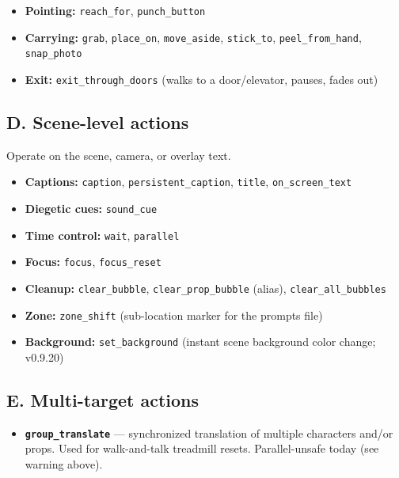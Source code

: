 \documentclass[
  11pt,
]{book}
\providecommand{\tightlist}{%
  \setlength{\itemsep}{0pt}\setlength{\parskip}{0pt}}
\begin{document}
\begin{itemize}
\tightlist
\item
  \textbf{Pointing:} \texttt{reach\_for}, \texttt{punch\_button}
\item
  \textbf{Carrying:} \texttt{grab}, \texttt{place\_on},
  \texttt{move\_aside}, \texttt{stick\_to}, \texttt{peel\_from\_hand},
  \texttt{snap\_photo}
\item
  \textbf{Exit:} \texttt{exit\_through\_doors} (walks to a
  door/elevator, pauses, fades out)
\end{itemize}

\subsection{D. Scene-level actions}\label{d.-scene-level-actions}

Operate on the scene, camera, or overlay text.

\begin{itemize}
\tightlist
\item
  \textbf{Captions:} \texttt{caption}, \texttt{persistent\_caption},
  \texttt{title}, \texttt{on\_screen\_text}
\item
  \textbf{Diegetic cues:} \texttt{sound\_cue}
\item
  \textbf{Time control:} \texttt{wait}, \texttt{parallel}
\item
  \textbf{Focus:} \texttt{focus}, \texttt{focus\_reset}
\item
  \textbf{Cleanup:} \texttt{clear\_bubble}, \texttt{clear\_prop\_bubble}
  (alias), \texttt{clear\_all\_bubbles}
\item
  \textbf{Zone:} \texttt{zone\_shift} (sub-location marker for the
  prompts file)
\item
  \textbf{Background:} \texttt{set\_background} (instant scene
  background color change; v0.9.20)
\end{itemize}

\subsection{E. Multi-target actions}\label{e.-multi-target-actions}

\begin{itemize}
\tightlist
\item
  \textbf{\texttt{group\_translate}} --- synchronized translation of
  multiple characters and/or props. Used for walk-and-talk treadmill
  resets. Parallel-unsafe today (see warning above).
\end{itemize}
\end{document}
